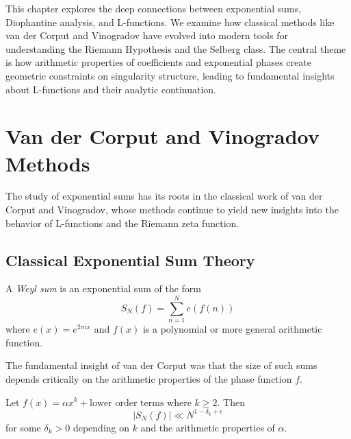 \label{ch:exponential_sums}

\begin{chapterabstract}
This chapter explores the deep connections between exponential sums, Diophantine analysis, and L-functions. We examine how classical methods like van der Corput and Vinogradov have evolved into modern tools for understanding the Riemann Hypothesis and the Selberg class. The central theme is how arithmetic properties of coefficients and exponential phases create geometric constraints on singularity structure, leading to fundamental insights about L-functions and their analytic continuation.
\end{chapterabstract}

\section{Van der Corput and Vinogradov Methods}
\label{sec:classical_methods}

The study of exponential sums has its roots in the classical work of van der Corput and Vinogradov, whose methods continue to yield new insights into the behavior of L-functions and the Riemann zeta function.

\subsection{Classical Exponential Sum Theory}

\begin{definition}
A \emph{Weyl sum} is an exponential sum of the form
\begin{equation}
S_N(f) = \sum_{n=1}^N e(f(n))
\end{equation}
where $e(x) = e^{2\pi i x}$ and $f(x)$ is a polynomial or more general arithmetic function.
\end{definition}

The fundamental insight of van der Corput was that the size of such sums depends critically on the arithmetic properties of the phase function $f$.

\begin{theorem}
Let $f(x) = \alpha x^k + \text{lower order terms}$ where $k \geq 2$. Then
\begin{equation}
|S_N(f)| \ll N^{1-\delta_k + \epsilon}
\end{equation}
for some $\delta_k > 0$ depending on $k$ and the arithmetic properties of $\alpha$.
\end{theorem}

